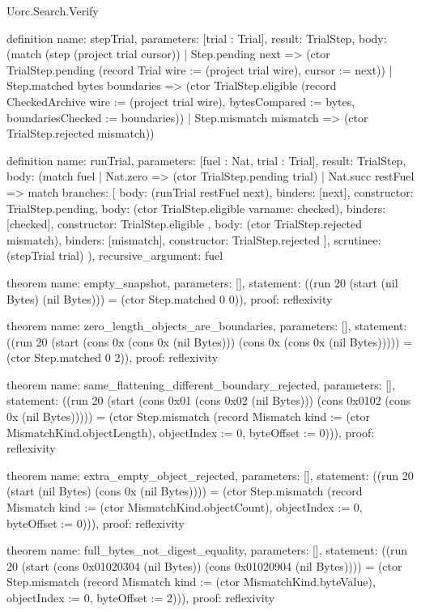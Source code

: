 \begin{lexlean}{Uorc.Search.Verify}
\begin{semanticmodule}
definition{
  name: stepTrial,
  parameters: [trial : Trial],
  result: TrialStep,
  body: (match (step (project trial cursor))
    | Step.pending next => (ctor TrialStep.pending (record Trial {wire := (project trial wire), cursor := next}))
    | Step.matched bytes boundaries => (ctor TrialStep.eligible (record CheckedArchive {wire := (project trial wire), bytesCompared := bytes, boundariesChecked := boundaries}))
    | Step.mismatch mismatch => (ctor TrialStep.rejected mismatch))
}

definition{
  name: runTrial,
  parameters: [fuel : Nat, trial : Trial],
  result: TrialStep,
  body: (match fuel
    | Nat.zero => (ctor TrialStep.pending trial)
    | Nat.succ restFuel => match{
      branches: [
        {body: (runTrial restFuel next), binders: [next], constructor: TrialStep.pending},
        {
          body: (ctor TrialStep.eligible var{name: checked}),
          binders: [checked],
          constructor: TrialStep.eligible
        },
        {
          body: (ctor TrialStep.rejected mismatch),
          binders: [mismatch],
          constructor: TrialStep.rejected
        }
      ],
      scrutinee: (stepTrial trial)
    }),
  recursive_argument: fuel
}

theorem{
  name: empty_snapshot,
  parameters: [],
  statement: ((run 20 (start (nil Bytes) (nil Bytes))) = (ctor Step.matched 0 0)),
  proof: reflexivity{}
}

theorem{
  name: zero_length_objects_are_boundaries,
  parameters: [],
  statement: ((run 20 (start (cons 0x (cons 0x (nil Bytes))) (cons 0x (cons 0x (nil Bytes))))) = (ctor Step.matched 0 2)),
  proof: reflexivity{}
}

theorem{
  name: same_flattening_different_boundary_rejected,
  parameters: [],
  statement: ((run 20 (start (cons 0x01 (cons 0x02 (nil Bytes))) (cons 0x0102 (cons 0x (nil Bytes))))) = (ctor Step.mismatch (record Mismatch {kind := (ctor MismatchKind.objectLength), objectIndex := 0, byteOffset := 0}))),
  proof: reflexivity{}
}

theorem{
  name: extra_empty_object_rejected,
  parameters: [],
  statement: ((run 20 (start (nil Bytes) (cons 0x (nil Bytes)))) = (ctor Step.mismatch (record Mismatch {kind := (ctor MismatchKind.objectCount), objectIndex := 0, byteOffset := 0}))),
  proof: reflexivity{}
}

theorem{
  name: full_bytes_not_digest_equality,
  parameters: [],
  statement: ((run 20 (start (cons 0x01020304 (nil Bytes)) (cons 0x01020904 (nil Bytes)))) = (ctor Step.mismatch (record Mismatch {kind := (ctor MismatchKind.byteValue), objectIndex := 0, byteOffset := 2}))),
  proof: reflexivity{}
}


\end{semanticmodule}
\end{lexlean}
